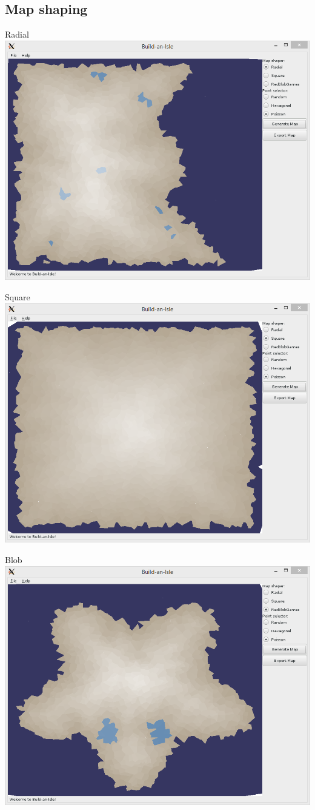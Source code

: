 \documentclass[english,aspectratio=43]{beamer}
\begin{document}
	\subsection{Map shaping}
	\begin{frame}{Radial}
		\centering
		\includegraphics[width=0.7\linewidth]{poisson}
	\end{frame}

	\begin{frame}{Square}
		\centering
		\includegraphics[width=0.7\linewidth]{square}
	\end{frame}

	\begin{frame}{Blob}
		\centering
		\includegraphics[width=0.7\linewidth]{blob}
	\end{frame}
\end{document}
